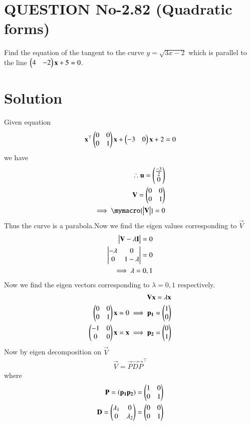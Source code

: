 \documentclass[journal,12pt,twocolumn]{IEEEtran}
\begin{document}
%
\section{QUESTION No-2.82 (Quadratic forms)}
\item Find the equation of the tangent to the curve $y=\sqrt{3x-2}$ which is parallel to the line $\begin{pmatrix}4&-2\end{pmatrix}\mathbf{x} + 5 = 0$.

%

\section{Solution}
Given equation
\begin{align}
    \mathbf{x}^{\top}\begin{pmatrix}0&0 \\ 0&1\end{pmatrix}\mathbf{x}+\begin{pmatrix}-3&0\end{pmatrix}\mathbf{x}+2=0 \label{eq:giveneq}
\end{align}
we have 
\begin{align}
\therefore \vec{u}=\myvec{\frac{-3}{2} \\ 0}
\\
\vec{V} =\myvec{0&0 \\ 0&1}
\\
\implies \mymacro{\mydet{\vec{V}}}=0
\end{align}
Thus the curve is a parabola.Now we find the eigen values corresponding to $\vec{V}$
\begin{align}
    \begin{vmatrix}\mathbf{V}-\lambda\mathbf{I}\end{vmatrix} = 0
    \\
    \begin{vmatrix}-\lambda&0 \\ 0&1-\lambda\end{vmatrix}=0
    \\
    \implies \lambda= 0,1
\end{align}
Now we find the eigen vectors corresponding to $\lambda= 0,1$ respectively.
\begin{align}
    \mathbf{V}\mathbf{x} = \lambda\mathbf{x}
    \\
    \begin{pmatrix}0&0 \\ 0&1\end{pmatrix}\mathbf{x} = 0\implies \mathbf{p_{1}}= \begin{pmatrix}1 \\ 0\end{pmatrix}
    \\
    \begin{pmatrix}-1&0 \\ 0&0\end{pmatrix}\mathbf{x} = \mathbf{x}\implies \mathbf{p_{2}}= \begin{pmatrix}0 \\ 1\end{pmatrix}
\end{align}
Now by eigen decomposition on $\vec{V}$
\begin{align}
    \vec{V} = \vec{P}\vec{D}\vec{P}^{\top}\label{eq:eqn1}
\end{align}
where 
\begin{align}
 \mathbf{P} = \left(\mathbf{p_{1}}\mathbf{p_{2}}\right) = \begin{pmatrix}1&0 \\ 0&1\end{pmatrix}
 \\
 \mathbf{D}=\begin{pmatrix}\lambda_{1}&0 \\ 0&\lambda_{2}\end{pmatrix} = \begin{pmatrix}0&0 \\ 0&1\end{pmatrix}
\end{align}
\end{document}
